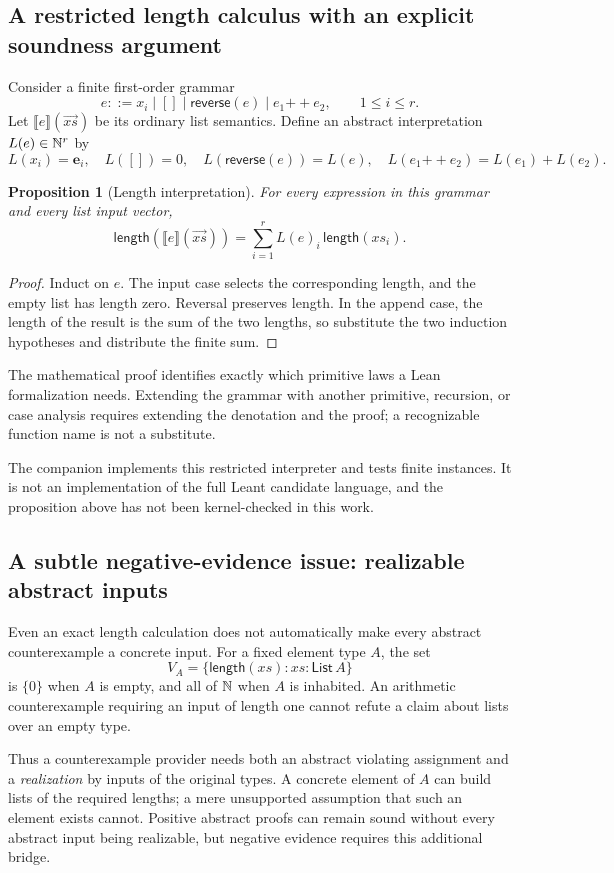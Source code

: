 \documentclass[11pt,a4paper]{article}
\newcommand{\eval}[1]{\llbracket #1\rrbracket}
\newcommand{\length}{\mathsf{length}}
\theoremstyle{plain}
\newtheorem{proposition}{Proposition}[section]
\theoremstyle{definition}
\theoremstyle{remark}
\begin{document}
\subsection{A restricted length calculus with an explicit soundness argument}
Consider a finite first-order grammar
\[
 e ::= x_i\mid []\mid\mathsf{reverse}(e)\mid e_1\mathbin{+\!+}e_2,
 \qquad 1\le i\le r.
\]
Let $\eval e(\vec{xs})$ be its ordinary list semantics. Define an abstract
interpretation $L(e)\in\mathbb N^r$ by
\[
 L(x_i)=\mathbf e_i,\quad L([])=0,\quad
 L(\mathsf{reverse}(e))=L(e),\quad L(e_1\mathbin{+\!+}e_2)=L(e_1)+L(e_2).
\]
\begin{proposition}[Length interpretation]
For every expression in this grammar and every list input vector,
\[
 \length(\eval e(\vec{xs}))
 =\sum_{i=1}^{r}L(e)_i\,\length(xs_i).
\]
\end{proposition}
\begin{proof}
Induct on $e$. The input case selects the corresponding length, and the empty
list has length zero. Reversal preserves length. In the append case, the
length of the result is the sum of the two lengths, so substitute the two
induction hypotheses and distribute the finite sum.
\end{proof}
The mathematical proof identifies exactly which primitive laws a Lean
formalization needs. Extending the grammar with another primitive, recursion,
or case analysis requires extending the denotation and the proof; a
recognizable function name is not a substitute.

The companion implements this restricted interpreter and tests finite
instances. It is not an implementation of the full Leant candidate language,
and the proposition above has not been kernel-checked in this work.

\subsection{A subtle negative-evidence issue: realizable abstract inputs}
Even an exact length calculation does not automatically make every abstract
counterexample a concrete input. For a fixed element type $A$, the set
\[
 V_A=\{\length(xs):xs:\mathsf{List}\,A\}
\]
is $\{0\}$ when $A$ is empty, and all of $\mathbb N$ when $A$ is inhabited. An
arithmetic counterexample requiring an input of length one cannot refute a
claim about lists over an empty type.

Thus a counterexample provider needs both an abstract violating assignment
and a \emph{realization} by inputs of the original types. A concrete element
of $A$ can build lists of the required lengths; a mere unsupported assumption
that such an element exists cannot. Positive abstract proofs can remain sound
without every abstract input being realizable, but negative evidence requires
this additional bridge.
\end{document}
